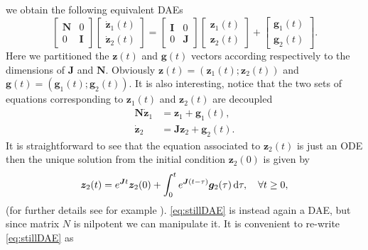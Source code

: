 		we obtain the following equivalent DAEs
		\begin{equation}
			\begin{bmatrix}
				\bm{N} & 0 \\
				0 & \bm{I}
			\end{bmatrix}
			\begin{bmatrix}
				\dot{\bm{z}}_{1}(t) \\
				\dot{\bm{z}}_{2}(t)
			\end{bmatrix} 
			= 
			\begin{bmatrix}
				\bm{I} & 0 \\
				0 & \bm{J}
			\end{bmatrix}
			\begin{bmatrix}
				\bm{z}_{1}(t) \\
				\bm{z}_{2}(t)
			\end{bmatrix}
			+ 
			\begin{bmatrix}
				\bm{g}_{1}(t) \\
				\bm{g}_{2}(t)
			\end{bmatrix}.
		\end{equation}
		Here we partitioned the $\bm{z}(t)$ and $\bm{g}(t)$
		vectors according respectively to the dimensions of  $\bm{J}$ and $\bm{N}$.
		Obviously $\bm{z}(t) = (\bm{z}_{1}(t);\bm{z}_{2}(t))$ and 
		$\bm{g}(t) = (\bm{g}_{1}(t);\bm{g}_{2}(t))$.
		It is also interesting, notice that the two sets of equations
		corresponding to $\bm{z}_{1}(t)$ and $\bm{z}_{2}(t)$ are decoupled
		\begin{subequations}
			\begin{align}
				\label{eq:stillDAE}
				\bm{N}\dot{\bm{z}}_{1} 	&= \bm{z}_{1} + \bm{g}_{1}(t), \\
				\dot{\bm{z}}_{2} 	&= \bm{J}\bm{z}_{2} + \bm{g}_{2}(t).
			\end{align}
		\end{subequations}
		It is straightforward to see that the equation associated to 
		$\bm{z}_{2}(t)$ is just an ODE then the unique solution
		from the initial condition $\bm{z}_{2}(0)$ is given by
		\begin{equation}
			\bm{z}_{2}(t) = e^{\bm{J}t}\bm{z}_{2}(0)+\int_{0}^{t}
			e^{\bm{J}(t-\tau)}\bm{g}_{2}(\tau)\mathop{}\!\mathrm{d}\tau,\quad \forall t\geq 0,
		\end{equation}
		(for further details see for example \cite{hespanha2009linear}).
		\cref{eq:stillDAE} is instead again a DAE, but since matrix $N$ is
		nilpotent we can manipulate it. It is convenient to re-write \cref{eq:stillDAE} as
